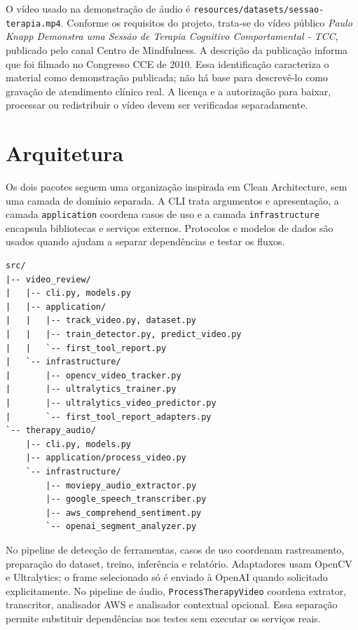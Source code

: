 \documentclass[12pt,a4paper]{article}
\begin{document}
O vídeo usado na demonstração de áudio é \texttt{resources/datasets/sessao-terapia.mp4}. Conforme os requisitos do projeto, trata-se do vídeo público \textit{Paulo Knapp Demonstra uma Sessão de Terapia Cognitivo Comportamental - TCC}, publicado pelo canal Centro de Mindfulness. A descrição da publicação informa que foi filmado no Congresso CCE de 2010. Essa identificação caracteriza o material como demonstração publicada; não há base para descrevê-lo como gravação de atendimento clínico real. A licença e a autorização para baixar, processar ou redistribuir o vídeo devem ser verificadas separadamente.

\section{Arquitetura}

Os dois pacotes seguem uma organização inspirada em Clean Architecture, sem uma camada de domínio separada. A CLI trata argumentos e apresentação, a camada \texttt{application} coordena casos de uso e a camada \texttt{infrastructure} encapsula bibliotecas e serviços externos. Protocolos e modelos de dados são usados quando ajudam a separar dependências e testar os fluxos.

\begin{lstlisting}[style=terminal]
src/
|-- video_review/
|   |-- cli.py, models.py
|   |-- application/
|   |   |-- track_video.py, dataset.py
|   |   |-- train_detector.py, predict_video.py
|   |   `-- first_tool_report.py
|   `-- infrastructure/
|       |-- opencv_video_tracker.py
|       |-- ultralytics_trainer.py
|       |-- ultralytics_video_predictor.py
|       `-- first_tool_report_adapters.py
`-- therapy_audio/
    |-- cli.py, models.py
    |-- application/process_video.py
    `-- infrastructure/
        |-- moviepy_audio_extractor.py
        |-- google_speech_transcriber.py
        |-- aws_comprehend_sentiment.py
        `-- openai_segment_analyzer.py
\end{lstlisting}

No pipeline de detecção de ferramentas, casos de uso coordenam rastreamento, preparação do dataset, treino, inferência e relatório. Adaptadores usam OpenCV e Ultralytics; o frame selecionado só é enviado à OpenAI quando solicitado explicitamente. No pipeline de áudio, \texttt{ProcessTherapyVideo} coordena extrator, transcritor, analisador AWS e analisador contextual opcional. Essa separação permite substituir dependências nos testes sem executar os serviços reais.
\end{document}
